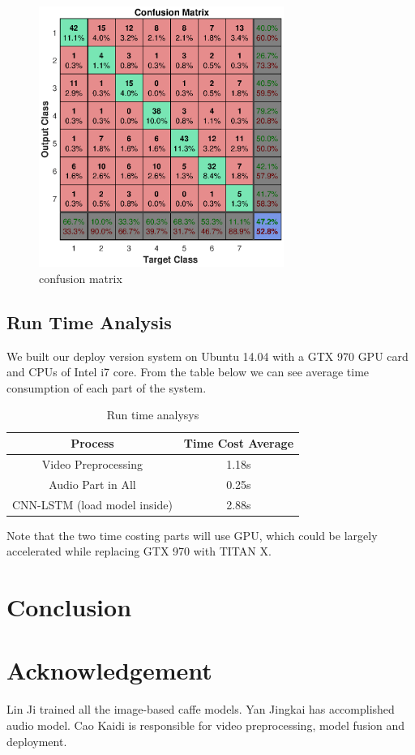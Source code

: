 \documentclass[10pt,twocolumn,letterpaper]{article}
\begin{document}
\begin{figure}[htpb]
	\centering
	\includegraphics[width = 8cm]{pic/res_confusion.eps}
	\caption{confusion matrix}
\end{figure}

\subsection{Run Time Analysis}

We built our deploy version system on Ubuntu 14.04 with a GTX 970 GPU card and CPUs of Intel i7 core. From the table below we can see average time consumption of each part of the system.

\begin{table}[htpb]
	\begin{center}
		\begin{tabular}{|c|c|}
			\hline
			\textbf{Process} & \textbf{Time Cost Average} \\
			\hline\hline
			Video Preprocessing & 1.18s\\
			Audio Part in All &  0.25s \\
			CNN-LSTM (load model inside) &  2.88s \\
			
			
			\hline
		\end{tabular}
	\end{center}
	\caption{Run time analysys}
	\label{runtime}
	
\end{table}

Note that the two time costing parts will use GPU, which could be largely accelerated while replacing GTX 970 with TITAN X.

\section{Conclusion}

\section{Acknowledgement}

Lin Ji trained all the image-based caffe models. Yan Jingkai has accomplished audio model. Cao Kaidi is responsible for video preprocessing, model fusion and deployment.

{\small


}
\end{document}
